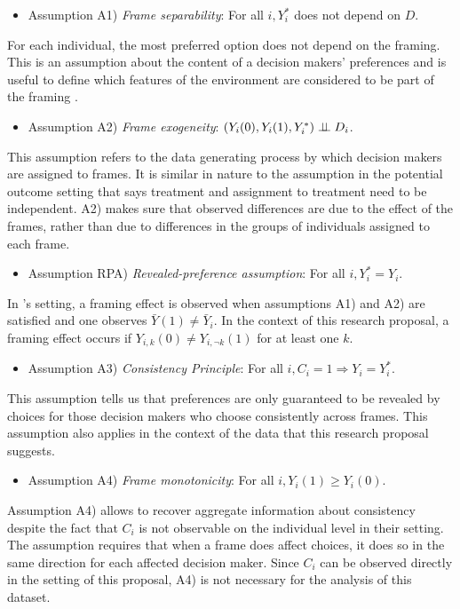 \begin{itemize}
    \item Assumption A1) \textit{Frame separability}: For all $ i, Y^*_i $ does not depend on $D$.
\end{itemize}

For each individual, the most preferred option does not depend on the framing.
This is an assumption about the content of a decision makers' preferences and is 
useful to define which features of the environment are considered to be part of the framing \parencite[p. 2764]{goldin2020}.

\begin{itemize}
    \item Assumption A2) \textit{Frame exogeneity}: $ (Y_i(0), Y_i(1), Y^*_i) \perp \!\!\! \perp D_i$.
\end{itemize}

This assumption refers to the data generating process by which decision makers are assigned to frames.
It is similar in nature to the assumption in the potential outcome setting that says treatment and
assignment to treatment need to be independent. A2) makes sure that observed differences
are due to the effect of the frames, rather than due to differences in the groups of individuals assigned
to each frame.

\begin{itemize}
    \item Assumption RPA) \textit{Revealed-preference assumption}: For all $ i, Y^*_i = Y_i $.
\end{itemize}

In \textcite{goldin2020}'s setting, a framing effect is observed when assumptions A1) and A2)
are satisfied and one observes $\bar{Y}(1) \neq \bar{Y}_i $. In the context
of this research proposal, a framing effect occurs if $ Y_{i, k}(0) \neq Y_{i, \lnot k}(1)$ for
at least one $k$.

\begin{itemize}
    \item Assumption A3) \textit{Consistency Principle}: For all $ i, C_i = 1 \Rightarrow Y_i = Y^*_i $.
\end{itemize}

This assumption tells us that preferences are only guaranteed
to be revealed by choices for those decision makers who choose consistently across frames.
This assumption also applies in the context of the data that this research proposal suggests.

\begin{itemize}
    \item Assumption A4) \textit{Frame monotonicity}: For all $ i, Y_i(1) \geq Y_i(0) $.
\end{itemize}

Assumption A4) allows \textcite{goldin2020} to recover aggregate information
about consistency despite the fact that $ C_i $ is not observable on the individual level in their setting. The assumption
requires that when a frame does affect choices, it does so in the same
direction for each affected decision maker.
Since $ C_i $ can be observed directly in the setting of this proposal, A4) is not necessary for the analysis of this
dataset.